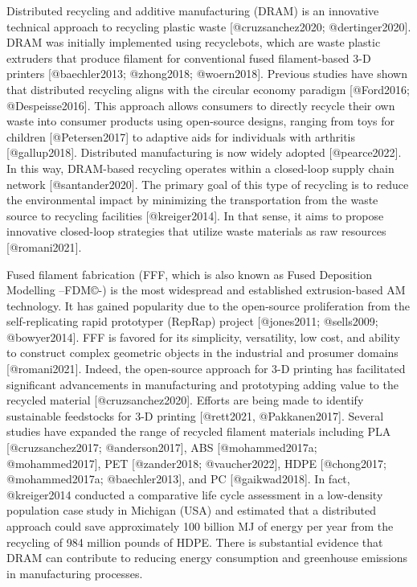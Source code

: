 \documentclass[
  letterpaper,
  DIV=11,
  numbers=noendperiod]{scrartcl}
\begin{document}
Distributed recycling and additive manufacturing (DRAM) is an innovative
technical approach to recycling plastic waste {[}@cruzsanchez2020;
@dertinger2020{]}. DRAM was initially implemented using recyclebots,
which are waste plastic extruders that produce filament for conventional
fused filament-based 3-D printers {[}@baechler2013; @zhong2018;
@woern2018{]}. Previous studies have shown that distributed recycling
aligns with the circular economy paradigm {[}@Ford2016;
@Despeisse2016{]}. This approach allows consumers to directly recycle
their own waste into consumer products using open-source designs,
ranging from toys for children {[}@Petersen2017{]} to adaptive aids for
individuals with arthritis {[}@gallup2018{]}. Distributed manufacturing
is now widely adopted {[}@pearce2022{]}. In this way, DRAM-based
recycling operates within a closed-loop supply chain network
{[}@santander2020{]}. The primary goal of this type of recycling is to
reduce the environmental impact by minimizing the transportation from
the waste source to recycling facilities {[}@kreiger2014{]}. In that
sense, it aims to propose innovative closed-loop strategies that utilize
waste materials as raw resources {[}@romani2021{]}.

Fused filament fabrication (FFF, which is also known as Fused Deposition
Modelling --FDM©-) is the most widespread and established
extrusion-based AM technology. It has gained popularity due to the
open-source proliferation from the self-replicating rapid prototyper
(RepRap) project {[}@jones2011; @sells2009; @bowyer2014{]}. FFF is
favored for its simplicity, versatility, low cost, and ability to
construct complex geometric objects in the industrial and prosumer
domains {[}@romani2021{]}. Indeed, the open-source approach for 3-D
printing has facilitated significant advancements in manufacturing and
prototyping adding value to the recycled material
{[}@cruzsanchez2020{]}. Efforts are being made to identify sustainable
feedstocks for 3-D printing {[}@rett2021, @Pakkanen2017{]}. Several
studies have expanded the range of recycled filament materials including
PLA {[}@cruzsanchez2017; @anderson2017{]}, ABS {[}@mohammed2017a;
@mohammed2017{]}, PET {[}@zander2018; @vaucher2022{]}, HDPE
{[}@chong2017; @mohammed2017a; @baechler2013{]}, and PC
{[}@gaikwad2018{]}. In fact, @kreiger2014 conducted a comparative life
cycle assessment in a low-density population case study in Michigan
(USA) and estimated that a distributed approach could save approximately
100 billion MJ of energy per year from the recycling of 984 million
pounds of HDPE. There is substantial evidence that DRAM can contribute
to reducing energy consumption and greenhouse emissions in manufacturing
processes.
\end{document}
